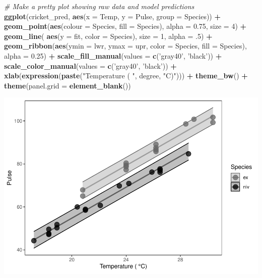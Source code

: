 \documentclass[
]{book}
\newenvironment{Shaded}{\begin{snugshade}}{\end{snugshade}}
\newcommand{\CommentTok}[1]{\textcolor[rgb]{0.56,0.35,0.01}{\textit{#1}}}
\newcommand{\DataTypeTok}[1]{\textcolor[rgb]{0.13,0.29,0.53}{#1}}
\newcommand{\DecValTok}[1]{\textcolor[rgb]{0.00,0.00,0.81}{#1}}
\newcommand{\FloatTok}[1]{\textcolor[rgb]{0.00,0.00,0.81}{#1}}
\newcommand{\KeywordTok}[1]{\textcolor[rgb]{0.13,0.29,0.53}{\textbf{#1}}}
\newcommand{\NormalTok}[1]{#1}
\newcommand{\OperatorTok}[1]{\textcolor[rgb]{0.81,0.36,0.00}{\textbf{#1}}}
\newcommand{\StringTok}[1]{\textcolor[rgb]{0.31,0.60,0.02}{#1}}
\begin{document}
\begin{Shaded}
\begin{Highlighting}[]
\CommentTok{# Make a pretty plot showing raw data and model predictions}
\KeywordTok{ggplot}\NormalTok{(cricket_pred, }\KeywordTok{aes}\NormalTok{(}\DataTypeTok{x =}\NormalTok{ Temp, }\DataTypeTok{y =}\NormalTok{ Pulse, }\DataTypeTok{group =}\NormalTok{ Species)) }\OperatorTok{+}
\StringTok{  }\KeywordTok{geom_point}\NormalTok{(}\KeywordTok{aes}\NormalTok{(}\DataTypeTok{colour =}\NormalTok{ Species, }\DataTypeTok{fill =}\NormalTok{ Species), }\DataTypeTok{alpha =} \FloatTok{0.75}\NormalTok{, }\DataTypeTok{size =} \DecValTok{4}\NormalTok{) }\OperatorTok{+}
\StringTok{  }\KeywordTok{geom_line}\NormalTok{( }\KeywordTok{aes}\NormalTok{(}\DataTypeTok{y =}\NormalTok{ fit, }\DataTypeTok{color =}\NormalTok{ Species), }\DataTypeTok{size =} \DecValTok{1}\NormalTok{, }\DataTypeTok{alpha =} \FloatTok{.5}\NormalTok{) }\OperatorTok{+}
\StringTok{  }\KeywordTok{geom_ribbon}\NormalTok{(}\KeywordTok{aes}\NormalTok{(}\DataTypeTok{ymin =}\NormalTok{ lwr, }\DataTypeTok{ymax =}\NormalTok{ upr, }\DataTypeTok{color =}\NormalTok{ Species, }\DataTypeTok{fill =}\NormalTok{ Species),}
              \DataTypeTok{alpha =} \FloatTok{0.25}\NormalTok{) }\OperatorTok{+}
\StringTok{  }\KeywordTok{scale_fill_manual}\NormalTok{(}\DataTypeTok{values =} \KeywordTok{c}\NormalTok{(}\StringTok{'gray40'}\NormalTok{, }\StringTok{'black'}\NormalTok{)) }\OperatorTok{+}
\StringTok{  }\KeywordTok{scale_color_manual}\NormalTok{(}\DataTypeTok{values =} \KeywordTok{c}\NormalTok{(}\StringTok{'gray40'}\NormalTok{, }\StringTok{'black'}\NormalTok{)) }\OperatorTok{+}
\StringTok{  }\KeywordTok{xlab}\NormalTok{(}\KeywordTok{expression}\NormalTok{(}\KeywordTok{paste}\NormalTok{(}\StringTok{"Temperature ( "}\NormalTok{, degree, }\StringTok{"C)"}\NormalTok{))) }\OperatorTok{+}
\StringTok{  }\KeywordTok{theme_bw}\NormalTok{() }\OperatorTok{+}\StringTok{ }
\StringTok{  }\KeywordTok{theme}\NormalTok{(}\DataTypeTok{panel.grid =} \KeywordTok{element_blank}\NormalTok{())}
\end{Highlighting}
\end{Shaded}

\includegraphics{worstr_files/figure-latex/unnamed-chunk-293-1.pdf}
\end{document}
